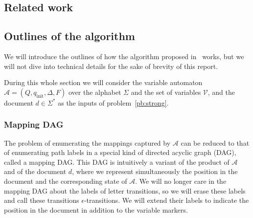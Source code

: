 \documentclass[12px]{article}
\theoremstyle{definition}
\begin{document}
    \subsection{Related work}


    \subsection{Outlines of the algorithm}

      We will introduce the outlines of how the algorithm proposed
      in~\cite{ICDT19} works, but we will not dive into technical details for
      the sake of brevity of this report.

      During this whole section we will consider the variable automaton
      $\mathcal{A} = (Q, q_\text{init}, \Delta, F)$ over the alphabet $\Sigma$
      and the set of variables $\mathcal{V}$, and the document $d \in \Sigma^*$
      as the inputs of problem~\ref{pb:strong}.

      \subsubsection{Mapping DAG}%
        \label{sec:mapping_dag}

        The problem of enumerating the mappings captured by $\mathcal{A}$ can
        be reduced to that of enumerating path labels in a special kind of
        directed acyclic graph (DAG), called a mapping DAG. This DAG is
        intuitively a variant of the product of $\mathcal{A}$ and of the
        document $d$, where we represent simultaneously the position in the
        document and the corresponding state of $\mathcal{A}$. We will no
        longer care in the mapping DAG about the labels of letter transitions,
        so we will erase these labels and call these transitions
        $\epsilon$-transitions.  We will extend their labels to indicate the
        position in the document in addition to the variable markers.
\end{document}
